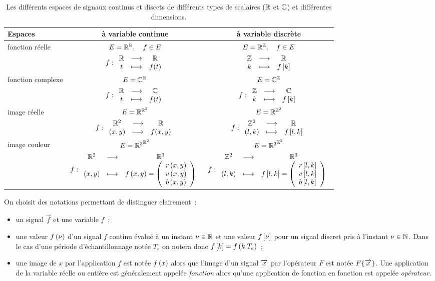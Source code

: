 \begin{table}[!ht]
  \begin{tabular}{p{}|c|c}
   Espaces  & à variable continue    & à variable discrète  \\\hline
    fonction réelle & $E=\R^\R,\quad f\in E $  &  $E=\R^\Z,\quad f\in E $   \\
            & $ f:\application{\R}{\R}{t}{f(t)} $   &  $\application{\Z}{\R}{k}{f\b{k}} $   \\
    \hline
        fonction complexe & $E=\C^\R$   &    $E=\C^\Z$  \\
    & $f:\application{\R}{\C}{t}{f(t)} $   &    $f:\application{\Z}{\C}{k}{f\b{k}} $     \\
    \hline
        image réelle & $E=\R^{\R^2}$   &   $E=\R^{\Z^2}$\\     
    & $f:\application{\R^2}{\R}{\p{x,y}}{f(x,y)} $   &   $f:\application{\Z^2}{\R}{\p{l,k}}{f\b{l,k}}$      \\
    \hline
       image  couleur & $E={\R^3}^{\R^2}$   &   $E={\R^3}^{\Z^2}$      \\
    & $f:\application{\R^2}{\R^3}{\p{x,y}}{f\p{x,y}=\vvvect{r\p{x,y}}{v\p{x,y}}{b\p{x,y}}} $   &   $f:\application{\Z^2}{\R^3}{\p{l,k}}{f\b{l,k}=\vvvect{r\b{l,k}}{v\b{l,k}}{b\b{l,k}}}$      \\
\hline
  \end{tabular}
  \caption{Les différents espaces de signaux continus et discets de différents types de scalaires ($\R$ et $\C$) et différentes dimensions.}
  \label{tab:espaces_signaux}
\end{table}

\begin{remarque}
  On choisit des notations permettant de distinguer clairement~:
  \begin{itemize}
  \item un signal $\vec{f}$  et une variable $f$~;
  \item une valeur $f\p{\nu}$ d'un signal $f$ continu évalué à un instant $\nu\in\R$ et une valeur $f\b{\nu}$ pour un signal discret pris à l'instant $\nu\in\N$. Dans le cas d'une période d'échantillonnage notée $T_e$ on notera donc $f\b{k}=f\p{k.T_e}$~;
   \item une image de $x$ par l'application $f$ est notée $f\p{x}$ alors que l'image d'un signal $\x$ par l'opérateur $F$ est notée $F\OperDe{\x}$. Une application de la variable réelle ou entière est généralement appelée \emph{fonction} alors qu'une application de fonction en fonction est appelée \emph{opérateur}. 
  \end{itemize}
\end{remarque}

